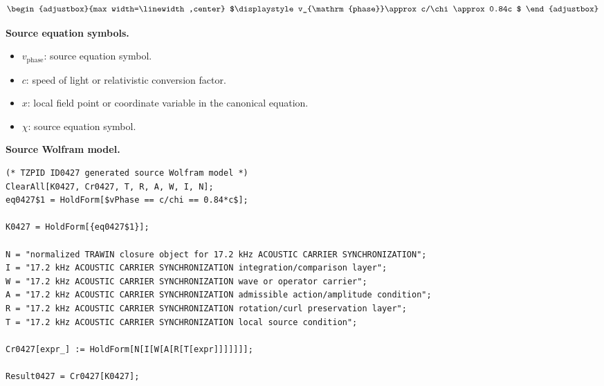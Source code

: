 \[
\begin{adjustbox}{max width=\linewidth,center}
$\displaystyle
v_{\mathrm{phase}}\approx c/\chi\approx0.84c
$
\end{adjustbox}
\]

\begin{minipage}[t]{0.49\linewidth}
\begingroup
\small
\raggedright
\textbf{Source equation symbols.}\par
\begin{itemize}[leftmargin=1.35em,itemsep=1pt,topsep=1pt,parsep=0pt]
    \item $v_{\mathrm{phase}}$: source equation symbol.
    \item $c$: speed of light or relativistic conversion factor.
    \item $x$: local field point or coordinate variable in the canonical equation.
    \item $\chi$: source equation symbol.
\end{itemize}
\endgroup
\end{minipage}\hfill
\begin{minipage}[t]{0.47\linewidth}
\begingroup
\scriptsize
\raggedright
\textbf{Source Wolfram model.}\par
\begin{Verbatim}[fontsize=\tiny,breaklines=true,breakanywhere=true]
(* TZPID ID0427 generated source Wolfram model *)
ClearAll[K0427, Cr0427, T, R, A, W, I, N];
eq0427$1 = HoldForm[$vPhase == c/chi == 0.84*c$];

K0427 = HoldForm[{eq0427$1}];

N = "normalized TRAWIN closure object for 17.2 kHz ACOUSTIC CARRIER SYNCHRONIZATION";
I = "17.2 kHz ACOUSTIC CARRIER SYNCHRONIZATION integration/comparison layer";
W = "17.2 kHz ACOUSTIC CARRIER SYNCHRONIZATION wave or operator carrier";
A = "17.2 kHz ACOUSTIC CARRIER SYNCHRONIZATION admissible action/amplitude condition";
R = "17.2 kHz ACOUSTIC CARRIER SYNCHRONIZATION rotation/curl preservation layer";
T = "17.2 kHz ACOUSTIC CARRIER SYNCHRONIZATION local source condition";

Cr0427[expr_] := HoldForm[N[I[W[A[R[T[expr]]]]]]];

Result0427 = Cr0427[K0427];
\end{Verbatim}
\endgroup
\end{minipage}

